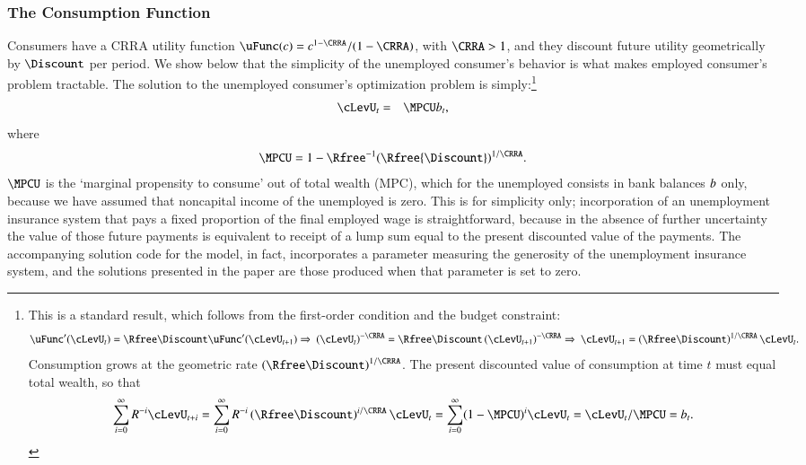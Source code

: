 \documentclass[titlepage,abstract]{\econtex}\newcommand{\texname}{ctDiscrete}
\begin{document}
\subsubsection{The Consumption Function }
Consumers have a CRRA utility function
$\uFunc(c)=c^{1-\CRRA}/(1-\CRRA)$, with $\CRRA>1$, and 
they discount future utility geometrically by $\Discount$ per
period.  We show below that the simplicity of the unemployed consumer's behavior is what makes employed consumer's problem tractable. 
The solution to the unemployed consumer's optimization problem
is simply:\footnote{This is a standard result, which follows from the first-order condition and the budget constraint:
\begin{eqnarray*}
\uFunc^{\prime}(\cLevU_{t}) = \Rfree\Discount \uFunc^{\prime}(\cLevU_{t+1})
\Rightarrow \
\left(\cLevU_{t}\right)^{-\CRRA} = \Rfree\Discount \left(\cLevU_{t+1}\right)^{-\CRRA} 
\Rightarrow \
\cLevU_{t+1} = \left(\Rfree\Discount\right)^{1/\CRRA} \cLevU_{t}
.
\end{eqnarray*}
Consumption grows at the geometric rate $\left(\Rfree\Discount\right)^{1/\CRRA}$. The present discounted value of consumption at time $t$ must equal total wealth, so that
\begin{eqnarray*} 
\sum_{i=0}^{\infty} R^{-i} \cLevU_{t+i} = \sum_{i=0}^{\infty} R^{-i} \left(\Rfree\Discount\right)^{i/\CRRA} \cLevU_{t} = \sum_{i=0}^{\infty} (1-\MPCU)^{i} \cLevU_{t} = \cLevU_{t} / \MPCU =  \bLev_{t}.
\end{eqnarray*}
}
\begin{eqnarray}
  \cLevU_{t} & = & \MPCU \bLev_{t} 
\label{eq:cpfinfhorunemp}
\label{eq:cdel}
\label{eq:kappaDef}
,
\end{eqnarray}
where 
\begin{eqnarray}
  \MPCU = 1 - \Rfree^{-1}(\Rfree{\Discount})^{1/\CRRA}
\label{eq:MPCU}
.
\end{eqnarray}
$\MPCU$ is the `marginal propensity to consume' out of total wealth
(MPC), which for the unemployed consists in bank balances $b$ only, 
because we have assumed that noncapital income of the unemployed is
zero.  This is for simplicity only; incorporation of an unemployment
insurance system that pays a fixed proportion of the final employed
wage is straightforward, because in the absence of further
uncertainty the value of those future payments is equivalent to
receipt of a lump sum equal to the present discounted value of the
payments.  The accompanying solution code for the model, in fact,
incorporates a parameter measuring the generosity of the
unemployment insurance system, and the solutions presented in the
paper are those produced when that parameter is set to zero.
\end{document}
